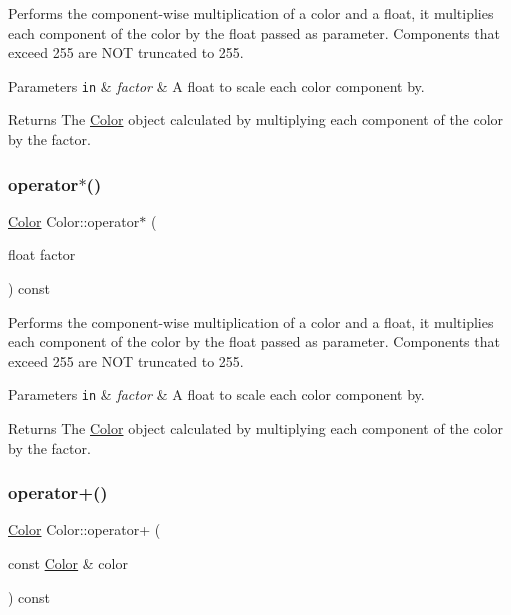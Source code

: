Performs the component-\/wise multiplication of a color and a float, it multiplies each component of the color by the float passed as parameter. Components that exceed 255 are N\+OT truncated to 255. 


\begin{DoxyParams}[1]{Parameters}
\mbox{\tt in}  & {\em factor} & A float to scale each color component by.\\
\hline
\end{DoxyParams}
\begin{DoxyReturn}{Returns}
The \hyperlink{classColor}{Color} object calculated by multiplying each component of the color by the factor. 
\end{DoxyReturn}
\mbox{\label{classColor_a1913ac35b2deeabf7f9bc449deae499e}} 
\subsubsection{\texorpdfstring{operator$\ast$()}{operator*()}\hspace{0.1cm}{\footnotesize\ttfamily [4/4]}}
{\footnotesize\ttfamily \hyperlink{classColor}{Color} Color\+::operator$\ast$ (\begin{DoxyParamCaption}\item[{float}]{factor }\end{DoxyParamCaption}) const}



Performs the component-\/wise multiplication of a color and a float, it multiplies each component of the color by the float passed as parameter. Components that exceed 255 are N\+OT truncated to 255. 


\begin{DoxyParams}[1]{Parameters}
\mbox{\tt in}  & {\em factor} & A float to scale each color component by.\\
\hline
\end{DoxyParams}
\begin{DoxyReturn}{Returns}
The \hyperlink{classColor}{Color} object calculated by multiplying each component of the color by the factor. 
\end{DoxyReturn}
\mbox{\label{classColor_acd40b26ca2f9217b5cde1e5c1251ef04}} 
\subsubsection{\texorpdfstring{operator+()}{operator+()}\hspace{0.1cm}{\footnotesize\ttfamily [1/2]}}
{\footnotesize\ttfamily \hyperlink{classColor}{Color} Color\+::operator+ (\begin{DoxyParamCaption}\item[{const \hyperlink{classColor}{Color} \&}]{color }\end{DoxyParamCaption}) const}



